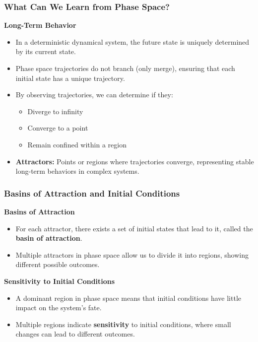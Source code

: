 \documentclass{beamer}
\begin{document}
\begin{frame}
    \frametitle{What Can We Learn from Phase Space?}

    \textbf{Long-Term Behavior}
    \begin{itemize}
        \item In a deterministic dynamical system, the future state is uniquely determined by its current state.
        \item Phase space trajectories do not branch (only merge), ensuring that each initial state has a unique trajectory.
        \item By observing trajectories, we can determine if they:
            \begin{itemize}
                \item Diverge to infinity
                \item Converge to a point
                \item Remain confined within a region
            \end{itemize}
        \item \textbf{Attractors:} Points or regions where trajectories converge, representing stable long-term behaviors in complex systems.
    \end{itemize}
\end{frame}

\begin{frame}
    \frametitle{Basins of Attraction and Initial Conditions}

    \textbf{Basins of Attraction}
    \begin{itemize}
        \item For each attractor, there exists a set of initial states that lead to it, called the \textbf{basin of attraction}.
        \item Multiple attractors in phase space allow us to divide it into regions, showing different possible outcomes.
    \end{itemize}

    \textbf{Sensitivity to Initial Conditions}
    \begin{itemize}
        \item A dominant region in phase space means that initial conditions have little impact on the system's fate.
        \item Multiple regions indicate \textbf{sensitivity} to initial conditions, where small changes can lead to different outcomes.
    \end{itemize}
\end{frame}
\end{document}
